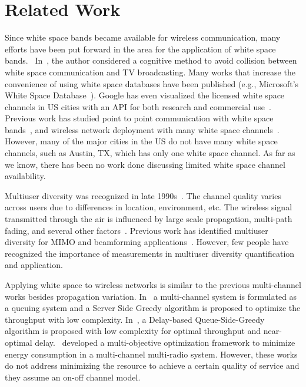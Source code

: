 \section{Related Work}
\label{sec:related}


Since white space bands became available for wireless communication, many efforts have been 
put forward in the area for the application of white space bands.~\cite{fccwhitespace} 
In~\cite{bahl2009white}, the author considered a cognitive method to avoid collision 
between white space communication and TV broadcasting. 
Many works that increase the convenience of using white space databases have been published 
(e.g., Microsoft's White Space Database~\cite{msdatabase}).
Google has even visualized the licensed white space channels 
in US cities with an API for both research and commercial use~\cite{googledatabase}.
Previous work has studied point to point communication with white space bands~\cite{cui2013leveraging}, 
and wireless network deployment with many white space channels~\cite{pcuiwinmee}.
However, many of the major cities in the US do not have many white space channels, such as Austin, TX, which has only one white space channel. 
As far as we know, there has been no work done discussing limited white space channel availability.

Multiuser diversity was recognized in late 1990s~\cite{heath2001multiuser}. The channel quality 
varies across users due to differences in location, environment, etc. The wireless signal transmitted through the 
air is influenced by large scale propagation, multi-path fading, and several other factors~\cite{gan2014multiple}.
Previous work has identified multiuser diversity for MIMO and beamforming applications~\cite{gao2013multiuser}.
However, few people have recognized the importance of measurements in multiuser diversity 
quantification and application.

Applying white space to wireless networks is similar to the previous multi-channel works besides 
propagation variation. In~\cite{bodas2012low} a multi-channel system is formulated as a queuing 
system and a Server Side Greedy algorithm is proposed to optimize the throughput with low complexity. 
In~\cite{ji2013performance}, a Delay-based Queue-Side-Greedy algorithm is proposed with low complexity 
for optimal throughput and near-optimal delay.~\cite{liu2014energy} developed a multi-objective optimization 
framework to minimize energy consumption in a multi-channel multi-radio system. 
However, these works do not address minimizing the resource to achieve a certain quality of service and they assume an 
on-off channel model.

